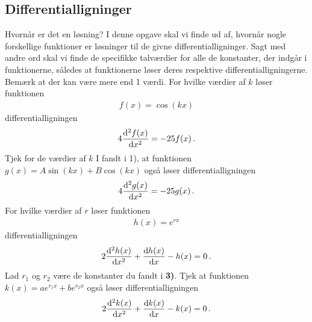 \subsection*{Differentialligninger}
\begin{opgave}{Hvornår er det en løsning?}
	I denne opgave skal vi finde ud af, hvornår nogle forskellige funktioner er løsninger til de givne differentialligninger. Sagt med andre ord skal vi finde de specifikke talværdier for alle de konstanter, der indgår i funktionerne, således at funktionerne løser deres respektive differentialligningerne. Bemærk at der kan være mere end 1 værdi.
	\opg For hvilke værdier af $k$ løser funktionen
	\begin{align*}
	f(x) = \cos(kx)
	\end{align*}
	differentialligningen
	\begin{align*}
	4 \dv[2]{f(x)}{x} = - 25f(x) \, .
	\end{align*}
	\opg Tjek for de værdier af $k$ I fandt i 1), at funktionen $g(x) = A \sin (kx) + B \cos (kx)$ også løser differentialligningen
	\begin{align*}
	4 \dv[2]{g(x)}{x} = -25 g(x) \, .
	\end{align*}
	\opg For hvilke værdier af $r$ løser funktionen
	\begin{align*}
	h(x) = e^{rx}
	\end{align*}
	differentialligningen
	\begin{align*}
	2 \dv[2]{h(x)}{x} + \dv{h(x)}{x} - h(x) = 0 \, .
	\end{align*}
	\opg Lad $r_1$ og $r_2$ være de konstanter du fandt i \textbf{3)}. Tjek at funktionen $k (x) = ae^{r_1x} + be^{r_2x} $ også løser differentialligningen
	\begin{align*}
	2 \dv[2]{k(x)}{x} + \dv{k(x)}{x} - k(x) = 0 \, .
	\end{align*}
\end{opgave}
